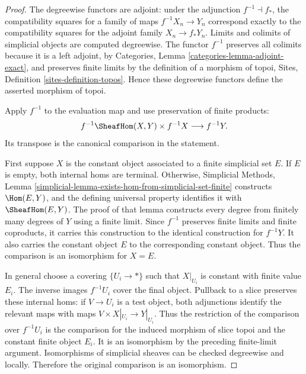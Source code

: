 \begin{proof}
The degreewise functors are adjoint: under the adjunction
$f^{-1} \dashv f_*$, the compatibility squares for a family of maps
$f^{-1}X_n \to Y_n$ correspond exactly to the compatibility squares for the
adjoint family $X_n \to f_*Y_n$.  Limits and colimits of simplicial objects
are computed degreewise.  The functor $f^{-1}$ preserves all colimits because
it is a left adjoint, by Categories, Lemma
\ref{categories-lemma-adjoint-exact}, and preserves finite limits by the
definition of a morphism of topoi, Sites, Definition
\ref{sites-definition-topos}.  Hence these degreewise functors define the
asserted morphism of topoi.

Apply $f^{-1}$ to the evaluation map and use preservation of finite products:
$$
f^{-1}\SheafHom(X,Y) \times f^{-1}X
\longrightarrow
f^{-1}Y.
$$
Its transpose is the canonical comparison in the statement.

First suppose $X$ is the constant object associated to a finite simplicial
set $E$.  If $E$ is empty, both internal homs are terminal.  Otherwise,
Simplicial Methods, Lemma
\ref{simplicial-lemma-exists-hom-from-simplicial-set-finite}
constructs $\Hom(E,Y)$, and the defining universal property identifies it
with $\SheafHom(E,Y)$.  The proof of that lemma constructs every degree from
finitely many degrees of $Y$ using a finite limit.  Since $f^{-1}$ preserves
finite limits and finite coproducts, it carries this construction to the
identical construction for $f^{-1}Y$.  It also carries the constant object
$E$ to the corresponding constant object.  Thus the comparison is an
isomorphism for $X=E$.

In general choose a covering $\{U_i \to *\}$ such that
$X|_{U_i}$ is constant with finite value $E_i$.  The inverse images
$f^{-1}U_i$ cover the final object.  Pullback to a slice preserves these
internal homs: if $V \to U_i$ is a test object, both adjunctions identify the
relevant maps with maps $V \times X|_{U_i} \to Y|_{U_i}$.  Thus the
restriction of the comparison over $f^{-1}U_i$ is the comparison for the
induced morphism of slice topoi and the constant finite object $E_i$.  It is
an isomorphism by the preceding finite-limit argument.  Isomorphisms of
simplicial sheaves can be checked degreewise and locally.  Therefore the
original comparison is an isomorphism.
\end{proof}
